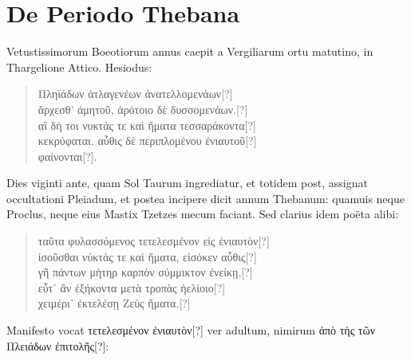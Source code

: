 \section{De Periodo Thebana}
Vetustissimorum Boeotiorum annus caepit a Vergiliarum
ortu matutino, in Thargelione Attico.
Hesiodus:
\begin{verse}
\textgreek{Πληϊάδων ἀτλαγενέων ἀνατελλομενάων[?]}\\ %
\textgreek{ἄρχεσθ’ ἀμητοῦ, ἀρότοιο δὲ δυσσομενάων.[?]}\\
\textgreek{αἳ δή τοι νυκτάς τε καὶ ἤματα τεσσαράκοντα[?]}\\
\textgreek{κεκρύφαται. αὖθις δὲ περιπλομένου ἐνιαυτοῦ[?]}\\
\textgreek{φαίνονται[?]}\emd{}.\\
\end{verse}
Dies viginti ante, quam Sol Taurum ingrediatur, et totidem post,
assignat occultationi Pleiadum, et postea incipere dicit annum Thebanum:
quamuis neque Proclus, neque eius Mastix Tzetzes mecum
faciant.
Sed clarius idem poëta alibi:
\begin{verse}
\textgreek{ταῦτα φυλασσόμενος τετελεσμένον εἰς ἐνιαυτὸν[?]}\\
\textgreek{ἰσοῦσθαι νύκτάς τε καὶ ἤματα, εἰσόκεν αὖθις[?]}\\
\textgreek{γῆ πάντων μήτηρ καρπὸν σύμμικτον ἐνείκῃ,[?]}\\
\textgreek{εὖτ᾽ ἂν ἑξήκοντα μετὰ τροπὰς ἠελίοιο[?]}\\
\textgreek{χειμέρι᾽ ἐκτελέσῃ Ζεὺς ἤματα.[?]}\emd{}
\end{verse}
Manifesto vocat \textgreek{τετελεσμένον ἐνιαυτὸν[?]} ver adultum,
 nimirum \textgreek{ἀπὸ τὴς τῶν Πλειάδων ἐπιτολῆς[?]}:
